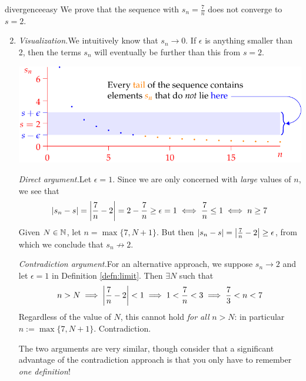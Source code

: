 \begin{examples}{}{divergenceeasy}
	\exstart We prove that the sequence with $s_n=\frac 7n$ does not converge to $s=2$.
	\begin{enumerate}\setcounter{enumi}{1}
	  \item[]\emph{Visualization.}\quad We intuitively know that $s_n\to 0$. If $\epsilon$ is anything smaller than 2, then the terms $s_n$ will eventually be further than this from $s=2$.
	  \begin{center}
  		\includegraphics[scale=0.9]{divergent}
  	\end{center}
  	\vspace{-5pt}
	  
  	\emph{Direct argument.}\quad Let $\epsilon=1$. Since we are only concerned with \emph{large} values of $n$, we see that
  	\[\left| s_n-s\right|=\left| \frac 7n-2\right|=2-\frac 7n\ge \epsilon= 1\iff \frac 7n\le 1\iff n\ge 7\]
  	Given $N\in\mathbb{N}$, let\footnotemark{} $n=\max\{7,N+1\}$. But then $\left| s_n-s\right|=\left| \frac 7n-2\right|\ge\epsilon$, from which we conclude that $s_n\nrightarrow 2$.
  	\smallbreak
  	
  	\emph{Contradiction argument.}\quad For an alternative approach, we suppose $s_n\to 2$ and let $\epsilon=1$ in Definition \ref{defn:limit}. Then $\exists N$ such that
  	\[n>N\implies \left| \frac 7n-2\right|<1 \implies 1<\frac 7n<3\implies \frac 73<n<7\]
  	Regardless of the value of $N$, this cannot hold \emph{for all} $n>N$: in particular $n:=\max\{7,N+1\}$. Contradiction.
  	\smallbreak
  	
  	The two arguments are very similar, though consider that a significant advantage of the contradiction approach is that you only have to remember \emph{one definition}!
	\end{enumerate}


\end{examples}

